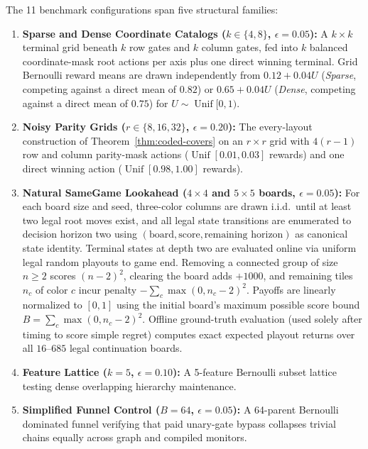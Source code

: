 \documentclass{article}
\theoremstyle{plain}
\theoremstyle{definition}
\begin{document}
The 11 benchmark configurations span five structural families:
\begin{enumerate}[leftmargin=18pt, itemsep=2pt]
\item \textbf{Sparse and Dense Coordinate Catalogs ($k \in \{4, 8\}$, $\epsilon = 0.05$):} A $k \times k$ terminal grid beneath $k$ row gates and $k$ column gates, fed into $k$ balanced coordinate-mask root actions per axis plus one direct winning terminal. Grid Bernoulli reward means are drawn independently from $0.12 + 0.04 U$ (\emph{Sparse}, competing against a direct mean of $0.82$) or $0.65 + 0.04 U$ (\emph{Dense}, competing against a direct mean of $0.75$) for $U \sim \operatorname{Unif}[0,1)$.
\item \textbf{Noisy Parity Grids ($r \in \{8, 16, 32\}$, $\epsilon = 0.20$):} The every-layout construction of Theorem~\ref{thm:coded-covers} on an $r \times r$ grid with $4(r-1)$ row and column parity-mask actions ($\operatorname{Unif}[0.01, 0.03]$ rewards) and one direct winning action ($\operatorname{Unif}[0.98, 1.00]$ rewards).
\item \textbf{Natural SameGame Lookahead ($4 \times 4$ and $5 \times 5$ boards, $\epsilon = 0.05$):} For each board size and seed, three-color columns are drawn i.i.d.\ until at least two legal root moves exist, and all legal state transitions are enumerated to decision horizon two using $(\text{board}, \text{score}, \text{remaining horizon})$ as canonical state identity. Terminal states at depth two are evaluated online via uniform legal random playouts to game end. Removing a connected group of size $n \ge 2$ scores $(n-2)^2$, clearing the board adds $+1000$, and remaining tiles $n_c$ of color $c$ incur penalty $-\sum_c \max(0, n_c - 2)^2$. Payoffs are linearly normalized to $[0,1]$ using the initial board's maximum possible score bound $B = \sum_c \max(0, n_c - 2)^2$. Offline ground-truth evaluation (used solely after timing to score simple regret) computes exact expected playout returns over all $16$--$685$ legal continuation boards.
\item \textbf{Feature Lattice ($k = 5$, $\epsilon = 0.10$):} A 5-feature Bernoulli subset lattice testing dense overlapping hierarchy maintenance.
\item \textbf{Simplified Funnel Control ($B = 64$, $\epsilon = 0.05$):} A 64-parent Bernoulli dominated funnel verifying that paid unary-gate bypass collapses trivial chains equally across graph and compiled monitors.
\end{enumerate}
\end{document}
